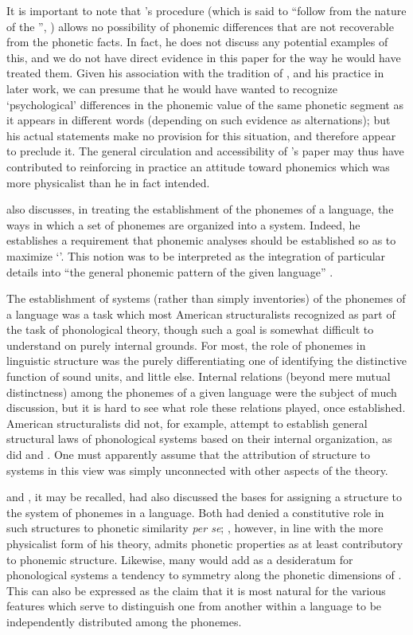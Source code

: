 It is important to note that {\Swadesh}'s procedure (which is said to
``follow from the nature of the '',
\citealt[123]{swadesh34:phoneme}) allows no possibility of phonemic
differences that are not recoverable from the phonetic facts. In fact,
he does not discuss any potential examples of this, and we do not have
direct evidence in this paper for the way he would have treated
them. Given his association with the tradition of {\Sapir}, and his
practice in later work, we can presume that he would have wanted to
recognize `psychological' differences in the phonemic value of the
same phonetic segment as it appears in different words (depending on
such evidence as alternations); but his actual statements make no
provision for this situation, and therefore appear to preclude it. The
general circulation and accessibility of {\Swadesh}'s paper may thus have
contributed to reinforcing in practice an attitude toward phonemics
which was more physicalist than he in fact intended.

{\Swadesh} also discusses, in treating the establishment of the phonemes
of a language, the ways in which a set of phonemes are organized into
a system. Indeed, he establishes a requirement that phonemic analyses
should be established so as to maximize `'. This
notion was to be interpreted as the integration of particular details
into ``the general phonemic pattern of the given language''
\citep[124]{swadesh34:phoneme}.

The establishment of systems (rather than simply inventories) of the
pho\-nemes of a language was a task which most American structuralists
recognized as part of the task of phonological theory, though such a
goal is somewhat difficult to understand on purely internal
grounds. For most, the role of phonemes in linguistic structure was
the purely differentiating one of identifying the distinctive function
of sound units, and little else. Internal relations (beyond mere
mutual distinctness) among the phonemes of a given language were the
subject of much discussion, but it is hard to see what role these
relations played, once established. American structuralists did not,
for example, attempt to establish general structural laws of
phonological systems based on their internal organization, as did
{\Trubetzkoy} and {\Jakobson}. One must apparently assume that the
attribution of structure to  systems in this view was simply
unconnected with other aspects of the theory.

{\Sapir} and {\Bloomfield}, it may be recalled, had also discussed the bases
for assigning a structure to the system of phonemes in a
language. Both had denied a constitutive role in such structures to
phonetic similarity \emph{per se}; {\Swadesh}, however, in line with the more
physicalist form of his theory, admits phonetic properties as at least
contributory to phonemic structure. Likewise, many would add as a
desideratum for phonological systems a tendency to symmetry along the
phonetic dimensions of . This can also be expressed as the
claim that it is most natural for the various features which serve to
distinguish one  from another within a language to be
independently distributed among the phonemes.


